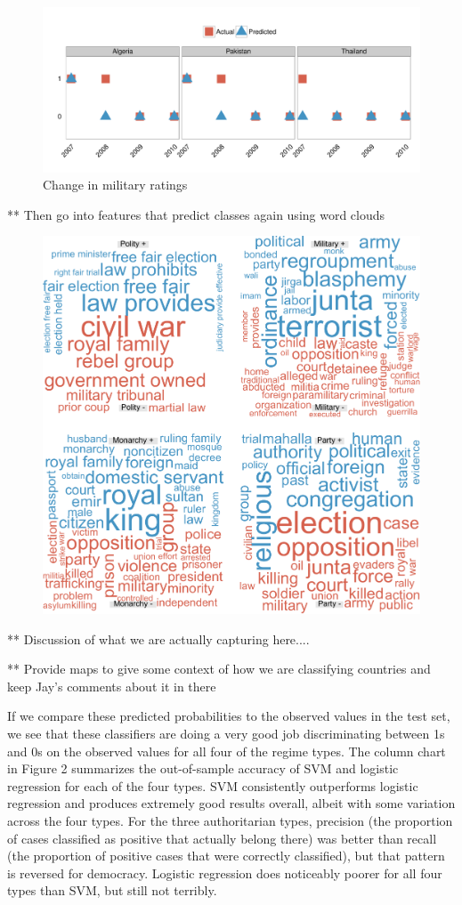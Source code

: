 \documentclass[pdftex,12pt,fullpage,oneside]{amsart}
\begin{document}
\begin{figure}[ht]
	\centering
	\includegraphics[width=.8\textwidth]{military_perfChange}
	\caption{Change in military ratings}
\end{figure}

** Then go into features that predict classes again using word clouds

\begin{figure}[ht]
	\centering
	\includegraphics[width=.7\textwidth]{pol_bin_wrdCloud}
\end{figure}
\FloatBarrier

** Discussion of what we are actually capturing here....

** Provide maps to give some context of how we are classifying countries and keep Jay's comments about it in there

If we compare these predicted probabilities to the observed values in the test set, we see that these classifiers are doing a very good job discriminating between 1s and 0s on the observed values for all four of the regime types. The column chart in Figure 2 summarizes the out-of-sample accuracy of SVM and logistic regression for each of the four types. SVM consistently outperforms logistic regression and produces extremely good results overall, albeit with some variation across the four types. For the three authoritarian types, precision (the proportion of cases classified as positive that actually belong there) was better than recall (the proportion of positive cases that were correctly classified), but that pattern is reversed for democracy. Logistic regression does noticeably poorer for all four types than SVM, but still not terribly.
\end{document}
